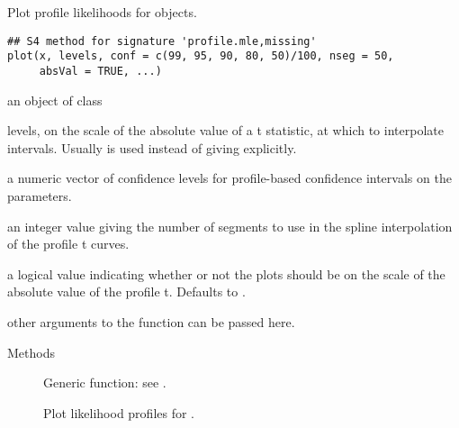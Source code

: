 %
\begin{Description}\relax
Plot profile likelihoods for  objects.
\end{Description}
%
\begin{Usage}
\begin{verbatim}
## S4 method for signature 'profile.mle,missing'
plot(x, levels, conf = c(99, 95, 90, 80, 50)/100, nseg = 50,
     absVal = TRUE, ...)
\end{verbatim}
\end{Usage}
%
\begin{Arguments}
\begin{ldescription}
\item[\code{x}] an object of class  
\item[\code{levels}] levels, on the scale of the absolute value of a t
statistic, at which to interpolate intervals.  Usually 
is used instead of giving  explicitly.
\item[\code{conf}] a numeric vector of confidence levels for profile-based
confidence intervals on the parameters.
\item[\code{nseg}] an integer value giving the number of segments to use in
the spline interpolation of the profile t curves.
\item[\code{absVal}] a logical value indicating whether or not the plots
should be on the scale of the absolute value of the profile t.
Defaults to .
\item[\code{...}] other arguments to the  function can be passed here.
\end{ldescription}
\end{Arguments}
%
\begin{Section}{Methods}
\begin{description}

\item[] Generic function: see
.
\item[] Plot
likelihood profiles for .

\end{description}

\end{Section}
